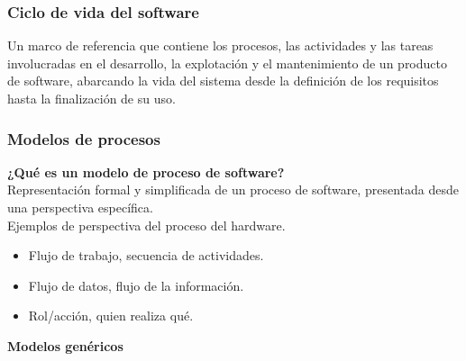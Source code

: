 \documentclass[12pt,twoside]{article}
\begin{document}
\subsubsection{Ciclo de vida del software}
Un marco de referencia que contiene los procesos, las actividades y las
tareas involucradas en el desarrollo, la explotación y el mantenimiento de un
producto de software, abarcando la vida del sistema desde la definición de
los requisitos hasta la finalización de su uso.\\
\subsubsection{Modelos de procesos}
\textbf{¿Qué es un modelo de proceso de software?}\\
Representación formal y simplificada de un proceso de software, presentada desde una 
perspectiva específica.\\
Ejemplos de perspectiva del proceso del hardware.
\begin{itemize}
    \item Flujo de trabajo, secuencia de actividades.
    \item Flujo de datos, flujo de la información.
    \item Rol/acción, quien realiza qué.
\end{itemize}
\textbf{Modelos genéricos}
\end{document}

